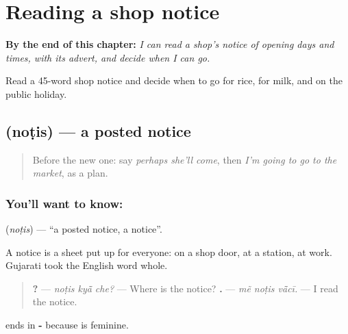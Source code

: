 
\chapter{Reading a shop notice}
\label{ch:gu-reading-a-shop-notice}

\begin{chapteropening}
\textbf{By the end of this chapter:} \emph{I can read a shop's notice of opening days and times, with its advert, and decide when I can go.}

Read a 45-word shop notice and decide when to go for rice, for milk, and on the public holiday.
\end{chapteropening}

\section[\texorpdfstring{\gu{નોટિસ} (noṭis)}{નોટિસ (noṭis)}]{ (noṭis) — a posted notice}

\label{lesson:GU-C151-notis}



\begin{quote}
Before the new one: say \emph{perhaps she'll come}, then \emph{I'm going to go to the market}, as a plan.
\end{quote}

\subsection*{You'll want to know: }
\textbf{} (\emph{noṭis}) — \textquotedblleft{}a posted notice, a notice\textquotedblright{}.

A notice is a sheet put up for everyone: on a shop door, at a station, at work. Gujarati took the English word whole.

\begin{quote}
\textbf{  ?} — \emph{noṭis kyā̃ che?} — Where is the notice? \textbf{  .} — \emph{mẽ noṭis vā̃cī.} — I read the notice.
\end{quote}

\textbf{} ends in \textbf{-} because \textbf{} is feminine.

